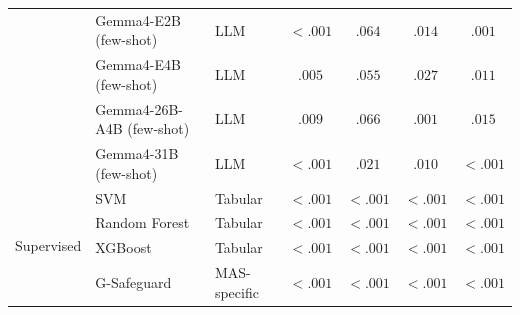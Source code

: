 \begin{table}[ht]
\begin{tabular}{lllcccc}
& Gemma4-E2B (few-shot) & LLM & $<.001$ & $.064$ & $.014$ & $.001$  \\
& Gemma4-E4B (few-shot) & LLM & $.005$ & $.055$ & $.027$ & $.011$  \\
& Gemma4-26B-A4B (few-shot) & LLM & $.009$ & $.066$ & $.001$ & $.015$  \\
& Gemma4-31B (few-shot) & LLM & $<.001$ & $.021$ & $.010$ & $<.001$  \\
\midrule
\multirow{4}{*}{Supervised} 
& SVM & Tabular & $<.001$ & $<.001$ & $<.001$ & $<.001$  \\
& Random Forest & Tabular & $\mathbf{<.001}$ & $<.001$ & $<.001$ & $\mathbf{<.001}$  \\
& XGBoost & Tabular & $<.001$ & $<.001$ & $\mathbf{<.001}$ & $<.001$  \\
& G-Safeguard & MAS-specific & $<.001$ & $\mathbf{<.001}$ & $<.001$ & $<.001$  \\
\bottomrule
    \end{tabular}
\end{table}

